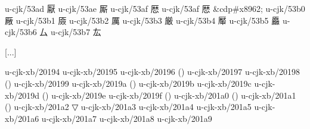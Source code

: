 \begin{multicols}{2}
[...]

u-cjk/53ad	{\cjk{}厭}	
u-cjk/53ae	{\cjk{}厮}	
u-cjk/53af	{\cjk{}厯}	
u-cjk/53af	{\cjk{}厯}	\&cdp\#x8962;
u-cjk/53b0	{\cjk{}厰}	
u-cjk/53b1	{\cjk{}厱}	
u-cjk/53b2	{\cjk{}厲}	
u-cjk/53b3	{\cjk{}厳}	
u-cjk/53b4	{\cjk{}厴}	
u-cjk/53b5	{\cjk{}厵}	
u-cjk/53b6	{\cjk{}厶}	
u-cjk/53b7	{\cjk{}厷}	

[...]

u-cjk-xb/20194	{	}
u-cjk-xb/20195	{	}
u-cjk-xb/20196	{	}()
u-cjk-xb/20197	{	}
u-cjk-xb/20198	{	}()
u-cjk-xb/20199	{	}
u-cjk-xb/2019a	{	}()
u-cjk-xb/2019b	{	}
u-cjk-xb/2019c	{	}
u-cjk-xb/2019d	{	}()
u-cjk-xb/2019e	{	}
u-cjk-xb/2019f	{	}()
u-cjk-xb/201a0	{	}()
u-cjk-xb/201a1	{	}()
u-cjk-xb/201a2	{	}▽
u-cjk-xb/201a3	{	}
u-cjk-xb/201a4	{	}
u-cjk-xb/201a5	{	}
u-cjk-xb/201a6	{	}
u-cjk-xb/201a7	{	}
u-cjk-xb/201a8	{	}
u-cjk-xb/201a9	{	}


\end{multicols}
